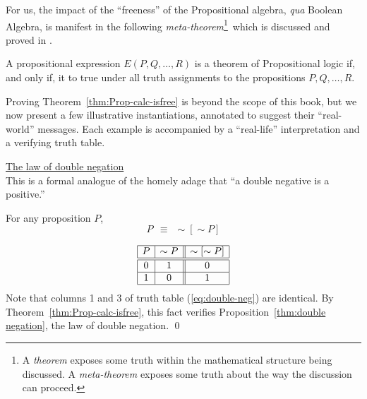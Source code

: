 \bigskip

\noindent
For us, the impact of the ``freeness'' of the Propositional algebra,
{\it qua} Boolean Algebra, is manifest in the following
{\em meta-theorem}\footnote{A {\it theorem} exposes some truth within
  the mathematical structure being discussed.  A {\it meta-theorem}
  exposes some truth about the way the discussion can proceed.}~which
is discussed and proved in \cite{Rosser53}.

\begin{theorem}
\label{thm:Prop-calc-isfree}
A propositional expression $E(P, Q, \ldots, R)$ is a theorem of
Propositional logic if, and only if, it to {\sc true} under all truth
assignments to the propositions $P, Q, \ldots, R$.
\end{theorem}

Proving Theorem~\ref{thm:Prop-calc-isfree} is beyond the scope of this
book, but we now present a few illustrative instantiations, annotated
to suggest their ``real-world'' messages.  Each example is accompanied
by a ``real-life'' interpretation and a verifying truth table.

\bigskip

\noindent
\underline{\small\sf The law of double negation} \\
This is a formal analogue of the homely adage that ``a double negative
is a positive.''

\begin{prop}
\label{thm:double negation}
For any proposition $P$,
\[ P \ \ \equiv \ \ \sim [\sim P] \]
\end{prop}

\begin{equation}
\label{eq:double-neg}
\begin{array}{|c|c||c|}
\hline
P & \sim P & \sim[\sim P] \\
\hline
\hline
0 & 1 & 0 \\
\hline
1 & 0 & 1 \\
\hline
\end{array}
\end{equation}
Note that columns 1 and 3 of truth table (\ref{eq:double-neg}) are
identical.  By Theorem~\ref{thm:Prop-calc-isfree}, this fact verifies
Proposition~\ref{thm:double negation}, the law of double negation.
\qed

\bigskip


